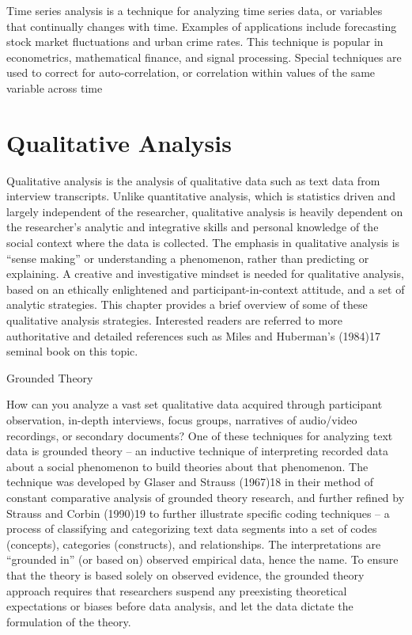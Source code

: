 Time series analysis is a technique for analyzing time series data, or variables that continually changes with time. Examples of applications include forecasting stock market fluctuations and urban crime rates. This technique is popular in econometrics, mathematical finance, and signal processing. Special techniques are used to correct for auto-correlation, or correlation within values of the same variable across time 


\section{Qualitative Analysis}

Qualitative analysis is the analysis of qualitative data such as text data from interview transcripts. Unlike quantitative analysis, which is statistics driven and largely independent of the researcher, qualitative analysis is heavily dependent on the researcher’s analytic and integrative skills and personal knowledge of the social context where the data is collected. The emphasis in qualitative analysis is “sense making” or understanding a phenomenon, rather than predicting or explaining. A creative and investigative mindset is needed for qualitative analysis, based on an ethically enlightened and participant-in-context attitude, and a set of analytic strategies. This chapter provides a brief overview of some of these qualitative analysis strategies. Interested readers are referred to more authoritative and detailed references such as Miles and Huberman’s (1984)17 seminal book on this topic. 

Grounded Theory

How can you analyze a vast set qualitative data acquired through participant observation, in-depth interviews, focus groups, narratives of audio/video recordings, or secondary documents? One of these techniques for analyzing text data is grounded theory – an inductive technique of interpreting recorded data about a social phenomenon to build theories about that phenomenon. The technique was developed by Glaser and Strauss (1967)18 in their method of constant comparative analysis of grounded theory research, and further refined by Strauss and Corbin (1990)19 to further illustrate specific coding techniques – a process of classifying and categorizing text data segments into a set of codes (concepts), categories (constructs), and relationships. The interpretations are “grounded in” (or based on) observed empirical data, hence the name. To ensure that the theory is based solely on observed evidence, the grounded theory approach requires that researchers suspend any preexisting theoretical expectations or biases before data analysis, and let the data dictate the formulation of the theory.

